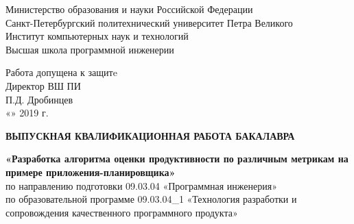 \begin{titlepage}

  \begin{center} %




    Министерство образования и науки Российской Федерации\\Санкт-Петербургский политехнический университет Петра Великого\\Институт компьютерных наук и технологий\\
    Высшая школа программной инженерии\\[0.9cm]
    {
    \begin{flushright}
      Работа допущена к защитe\\
      Директор ВШ ПИ\\
      \underline{\hspace{1.5cm}} П.Д. Дробинцев\\
      «\underline{\hspace{0.4cm}}»\underline{\hspace{2.3cm}} 2019 г.\\[1.8cm]
    \end{flushright}
    }
    {\Large \bfseries ВЫПУСКНАЯ КВАЛИФИКАЦИОННАЯ РАБОТА БАКАЛАВРА}\\[1.0cm] %

    \bigskip
    \bigskip

    {\Large \bfseries «Разработка алгоритма оценки продуктивности по различным метрикам на примере приложения-планировщика»}\\[0.7cm] %

    {
    по направлению подготовки
    09.03.04 «Программная инженерия»\\
    по образовательной программе 09.03.04\_1 «Технология разработки и сопровождения качественного программного продукта»\\[1.6cm]
    }

    \bigskip
    \bigskip
    {
      \begin{multicols}{3}
        \begin{flushleft}


\end{flushleft}
\end{multicols}}
\end{center}
\end{titlepage}
